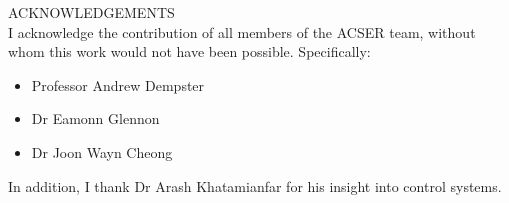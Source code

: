 ACKNOWLEDGEMENTS\\
I acknowledge the contribution of all members of the ACSER team, without whom this work would not have been possible. Specifically:
\begin{itemize}
\item{Professor Andrew Dempster}
\item{Dr Eamonn Glennon}
\item{Dr Joon Wayn Cheong}
\end{itemize}

In addition, I thank Dr Arash Khatamianfar for his insight into control systems.
